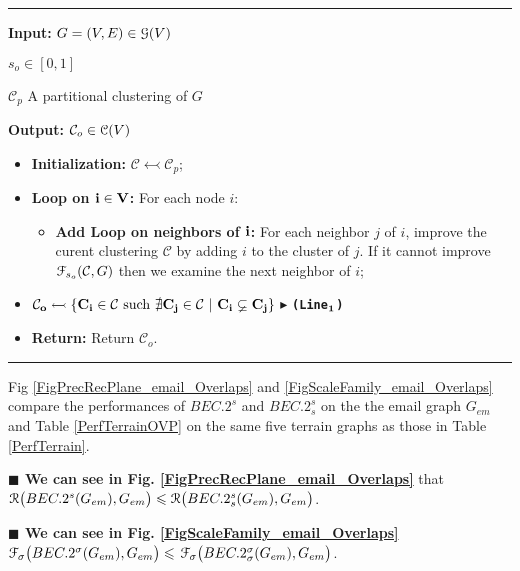 \documentclass[12pt]{article}
\theoremstyle{thmstyleone}%
\theoremstyle{definition}
\begin{document}
\vspace{-0.2cm}
\noindent
\rule{16cm}{0.025cm}

\noindent
{\bf Input:} $G = (V, E) \in \EuScript{G}(V)$

\noindent
\hspace{1.3cm}$s_o \in [0, 1]$

\noindent
\hspace{1.3cm}$\mathcal{C}_{p}$ A partitional clustering of $G$

\noindent
{\bf Output:}  $\mathcal{C}_{o} \in \EuScript{C}(V)$
\begin{itemize}
 \item[{\bf }] {\bf Initialization:}  $\mathcal{C} \leftarrowtail \mathcal{C}_{p}$;

 \item[] {\bf Loop on $\bf i \in V$:} For each node $i$:
  \vspace{-0.20cm}
 \begin{itemize}
 \item[] {\bf Add Loop on neighbors of $\bf i$:} For each neighbor $j$ of $i$, improve the curent clustering $\mathcal{C}$ by adding $i$ to the cluster of $j$. If it cannot improve $\EuScript{F}_{s_o}(\mathcal{C},G)$ then we examine the next neighbor of $i$;
\end{itemize}

  \item[] $\bf \mathcal{C}_{o} \leftarrowtail \{ C_i \in \mathcal{C} \text{ such } \nexists C_j \in \mathcal{C} ~|~C_i \varsubsetneq C_j \}$
  $\blacktriangleright$ \texttt{{\bf (Line$\bf_1$)}}

 \item[{\bf }] {\bf Return:} Return $\mathcal{C}_{o}$.
\end{itemize}
\vspace{-0.5cm}
\noindent
\rule{16cm}{0.025cm}

Fig \ref{FigPrecRecPlane_email_Overlaps} and \ref{FigScaleFamily_email_Overlaps} compare the performances of
$BEC.2^{s}$ and
$BEC.2^{s}_{s}$ on the the email graph $G_{em}$
and Table \ref{PerfTerrainOVP} on the same five terrain graphs as those in Table \ref{PerfTerrain}.

\noindent
{\bf $\blacksquare$ We can see in Fig. \ref{FigPrecRecPlane_email_Overlaps}} that
$\EuScript{R}\big(BEC.2^{s}(G_{em}),G_{em}\big) \leqslant \EuScript{R}\big(BEC.2^{s}_{s}(G_{em}),G_{em}\big)$.

\noindent
{\bf $\blacksquare$ We can see in Fig. \ref{FigScaleFamily_email_Overlaps}} $\EuScript{F_{\sigma}}\big(BEC.2^{\sigma}(G_{em}),G_{em}\big) \leqslant$ $\EuScript{F_{\sigma}}\big(BEC.2^{\sigma}_{\sigma}(G_{em}),G_{em}\big)$.
\end{document}
